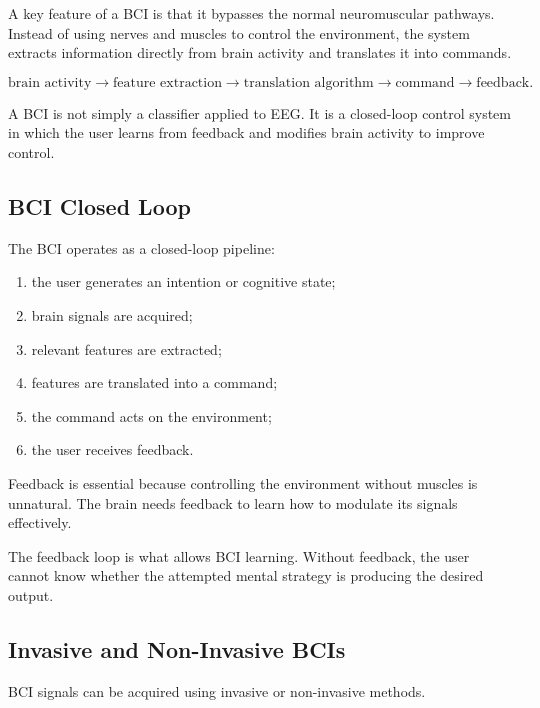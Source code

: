 A key feature of a BCI is that it bypasses the normal neuromuscular pathways. Instead of using nerves and muscles to control the environment, the system extracts information directly from brain activity and translates it into commands.

\[
\text{brain activity}
\rightarrow
\text{feature extraction}
\rightarrow
\text{translation algorithm}
\rightarrow
\text{command}
\rightarrow
\text{feedback}.
\]

\begin{authornote}
A BCI is not simply a classifier applied to EEG. It is a closed-loop control system in which the user learns from feedback and modifies brain activity to improve control.
\end{authornote}

\subsection{BCI Closed Loop}

The BCI operates as a closed-loop pipeline:

\begin{enumerate}[noitemsep]
    \item the user generates an intention or cognitive state;
    \item brain signals are acquired;
    \item relevant features are extracted;
    \item features are translated into a command;
    \item the command acts on the environment;
    \item the user receives feedback.
\end{enumerate}

Feedback is essential because controlling the environment without muscles is unnatural. The brain needs feedback to learn how to modulate its signals effectively.

\begin{authornote}
The feedback loop is what allows BCI learning. Without feedback, the user cannot know whether the attempted mental strategy is producing the desired output.
\end{authornote}

\subsection{Invasive and Non-Invasive BCIs}

BCI signals can be acquired using invasive or non-invasive methods.

